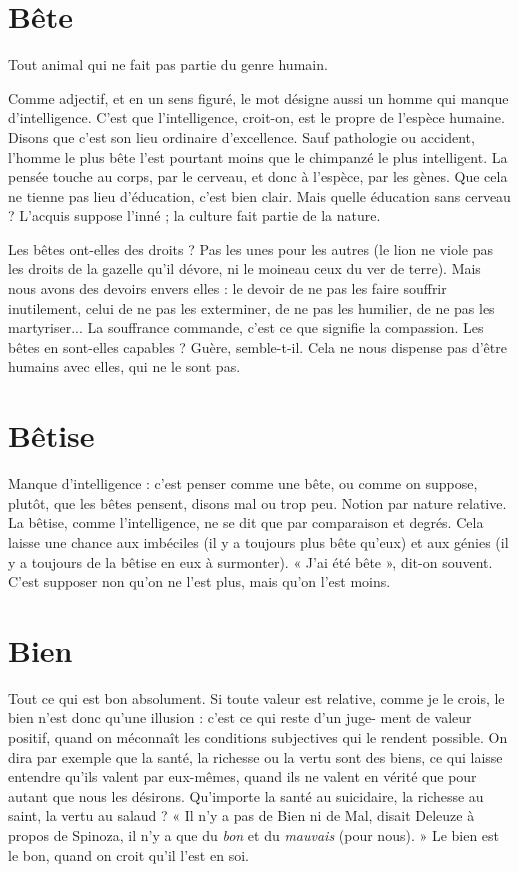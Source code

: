 \section{Bête}
Tout animal qui ne fait pas partie du genre humain.

Comme adjectif, et en un sens figuré, le mot désigne aussi un homme
qui manque d'intelligence. C’est que l'intelligence, croit-on, est le propre de
l'espèce humaine. Disons que c’est son lieu ordinaire d’excellence. Sauf pathologie
ou accident, l’homme le plus bête l’est pourtant moins que le chimpanzé
le plus intelligent. La pensée touche au corps, par le cerveau, et donc à l’espèce,
par les gènes. Que cela ne tienne pas lieu d'éducation, c’est bien clair. Mais
quelle éducation sans cerveau ? L’acquis suppose l’inné ; la culture fait partie de
la nature.

Les bêtes ont-elles des droits ? Pas les unes pour les autres (le lion ne viole
pas les droits de la gazelle qu’il dévore, ni le moineau ceux du ver de terre).
Mais nous avons des devoirs envers elles : le devoir de ne pas les faire souffrir
inutilement, celui de ne pas les exterminer, de ne pas les humilier, de ne pas les
martyriser... La souffrance commande, c’est ce que signifie la compassion. Les
bêtes en sont-elles capables ? Guère, semble-t-il. Cela ne nous dispense pas
d’être humains avec elles, qui ne le sont pas.

\section{Bêtise}
Manque d’intelligence : c’est penser comme une bête, ou comme on
suppose, plutôt, que les bêtes pensent, disons mal ou trop peu.
Notion par nature relative. La bêtise, comme l'intelligence, ne se dit que par
comparaison et degrés. Cela laisse une chance aux imbéciles (il y a toujours plus
bête qu’eux) et aux génies (il y a toujours de la bêtise en eux à surmonter). « J'ai
été bête », dit-on souvent. C’est supposer non qu’on ne l’est plus, mais qu’on
l'est moins.

\section{Bien}
Tout ce qui est bon absolument. Si toute valeur est relative, comme je
le crois, le bien n’est donc qu’une illusion : c’est ce qui reste d’un juge-
ment de valeur positif, quand on méconnaît les conditions subjectives qui le
rendent possible. On dira par exemple que la santé, la richesse ou la vertu sont
des biens, ce qui laisse entendre qu’ils valent par eux-mêmes, quand ils ne
valent en vérité que pour autant que nous les désirons. Qu'importe la santé au
suicidaire, la richesse au saint, la vertu au salaud ? « Il n’y a pas de Bien ni de
Mal, disait Deleuze à propos de Spinoza, il n’y a que du {\it bon} et du {\it mauvais}
(pour nous). » Le bien est le bon, quand on croit qu’il l’est en soi.

